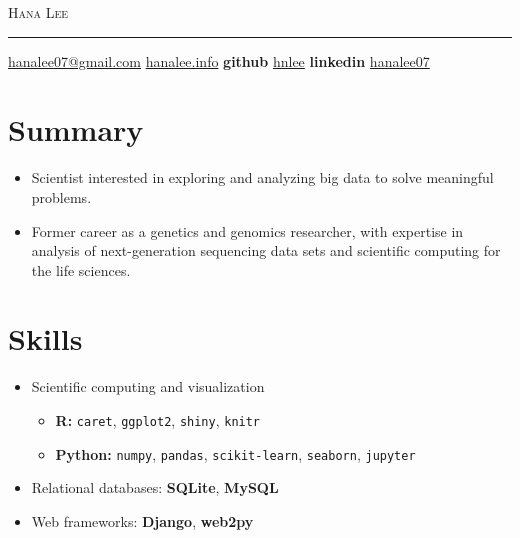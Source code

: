 \documentclass[letterpaper,12pt]{article}
\begin{document}
{\Huge\textsc{Hana Lee}}\\
\rule[0.5em]{\textwidth}{0.5pt}

\begin{center}
    \href{hanalee07@gmail.com}{hanalee07@gmail.com}
    \textbullet\enskip\href{http://hanalee.info}{hanalee.info}
    \textbullet\enskip\textbf{github} \href{https://github.com/hnlee}{hnlee}
    \textbullet\enskip\textbf{linkedin} \href{https://www.linkedin.com/in/hanalee07}{hanalee07}
\end{center}


\section*{Summary}
\begin{itemize}
    \item Scientist interested in exploring and analyzing big data to solve meaningful problems.
    \item Former career as a genetics and genomics researcher, with expertise in analysis of next-generation sequencing data sets and scientific computing for the life sciences.
\end{itemize}

\section*{Skills}
\begin{itemize}
    \item Scientific computing and visualization 
        \begin{itemize}
            \item \textbf{R:} \texttt{caret}, \texttt{ggplot2}, \texttt{shiny}, \texttt{knitr}
            \item \textbf{Python:} \texttt{numpy}, \texttt{pandas}, \texttt{scikit-learn}, \texttt{seaborn}, \texttt{jupyter}
        \end{itemize}
    \item Relational databases: \textbf{SQLite}, \textbf{MySQL}
    \item Web frameworks: \textbf{Django}, \textbf{web2py}
\end{itemize}
\end{document}
